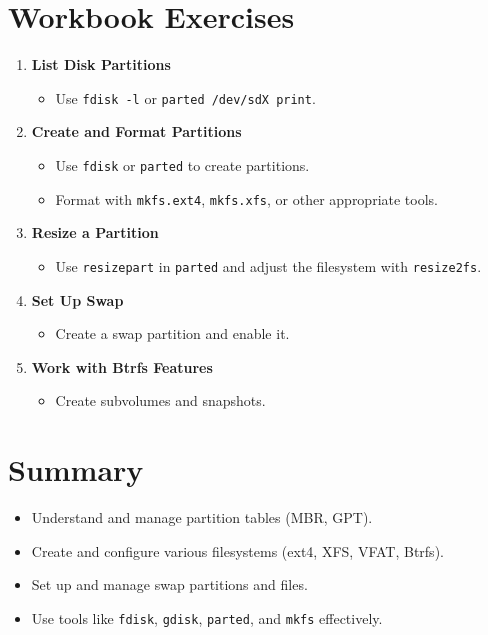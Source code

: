 \documentclass[a4paper]{report}
\begin{document}
\section*{Workbook Exercises}

\begin{enumerate}
    \item \textbf{List Disk Partitions}
    \begin{itemize}
        \item Use \texttt{fdisk -l} or \texttt{parted /dev/sdX print}.
    \end{itemize}
    \item \textbf{Create and Format Partitions}
    \begin{itemize}
        \item Use \texttt{fdisk} or \texttt{parted} to create partitions.
        \item Format with \texttt{mkfs.ext4}, \texttt{mkfs.xfs}, or other appropriate tools.
    \end{itemize}
    \item \textbf{Resize a Partition}
    \begin{itemize}
        \item Use \texttt{resizepart} in \texttt{parted} and adjust the filesystem with \texttt{resize2fs}.
    \end{itemize}
    \item \textbf{Set Up Swap}
    \begin{itemize}
        \item Create a swap partition and enable it.
    \end{itemize}
    \item \textbf{Work with Btrfs Features}
    \begin{itemize}
        \item Create subvolumes and snapshots.
    \end{itemize}
\end{enumerate}

\section*{Summary}
\begin{itemize}
    \item Understand and manage partition tables (MBR, GPT).
    \item Create and configure various filesystems (ext4, XFS, VFAT, Btrfs).
    \item Set up and manage swap partitions and files.
    \item Use tools like \texttt{fdisk}, \texttt{gdisk}, \texttt{parted}, and \texttt{mkfs} effectively.
\end{itemize}
\end{document}
